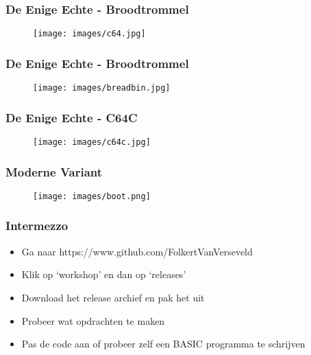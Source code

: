 \documentclass[aspectratio=43]{uva-inf-presentation}
\begin{document}

\begin{frame}
\frametitle{De Enige Echte - Broodtrommel}

\begin{figure}
\texttt{[image: images/c64.jpg]}
\end{figure}

\end{frame}


\begin{frame}
\frametitle{De Enige Echte - Broodtrommel}

\begin{figure}
\texttt{[image: images/breadbin.jpg]}
\end{figure}

\end{frame}


\begin{frame}
\frametitle{De Enige Echte - C64C}

\begin{figure}
\texttt{[image: images/c64c.jpg]}
\end{figure}

\end{frame}


\begin{frame}
\frametitle{Moderne Variant}

\begin{figure}
\texttt{[image: images/boot.png]}
\end{figure}

\end{frame}


\begin{frame}
\frametitle{Intermezzo}

\begin{itemize}
\item Ga naar https://www.github.com/FolkertVanVerseveld
\item Klik op `workshop' en dan op `releases'
\item Download het release archief en pak het uit
\item Probeer wat opdrachten te maken
\item Pas de code aan of probeer zelf een BASIC programma te schrijven
\end{itemize}

\end{frame}
\end{document}
